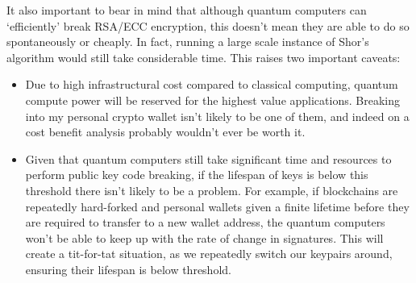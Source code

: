 It also important to bear in mind that although quantum computers can `efficiently' break RSA/ECC encryption, this doesn't mean they are able to do so spontaneously or cheaply. In fact, running a large scale instance of Shor's algorithm would still take considerable time. This raises two important caveats:
\begin{itemize}
	\item Due to high infrastructural cost compared to classical computing, quantum compute power will be reserved for the highest value applications. Breaking into my personal crypto wallet isn't likely to be one of them, and indeed on a cost benefit analysis probably wouldn't ever be worth it.
	\item Given that quantum computers still take significant time and resources to perform public key code breaking, if the lifespan of keys is below this threshold there isn't likely to be a problem. For example, if blockchains are repeatedly hard-forked and personal wallets given a finite lifetime before they are required to transfer to a new wallet address, the quantum computers won't be able to keep up with the rate of change in signatures. This will create a tit-for-tat situation, as we repeatedly switch our keypairs around, ensuring their lifespan is below threshold.
\end{itemize}